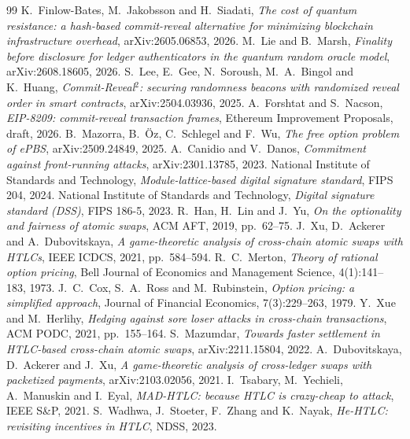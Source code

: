 \documentclass[11pt]{article}
\begin{document}
\begin{thebibliography}{99}
 K.~Finlow-Bates, M.~Jakobsson and H.~Siadati, \emph{The cost of quantum resistance: a hash-based commit-reveal alternative for minimizing blockchain infrastructure overhead}, arXiv:2605.06853, 2026.
 M.~Lie and B.~Marsh, \emph{Finality before disclosure for ledger authenticators in the quantum random oracle model}, arXiv:2608.18605, 2026.
 S.~Lee, E.~Gee, N.~Soroush, M.~A.~Bingol and K.~Huang, \emph{Commit-Reveal$^2$: securing randomness beacons with randomized reveal order in smart contracts}, arXiv:2504.03936, 2025.
 A.~Forshtat and S.~Nacson, \emph{EIP-8209: commit-reveal transaction frames}, Ethereum Improvement Proposals, draft, 2026.
 B.~Mazorra, B.~\"Oz, C.~Schlegel and F.~Wu, \emph{The free option problem of ePBS}, arXiv:2509.24849, 2025.
 A.~Canidio and V.~Danos, \emph{Commitment against front-running attacks}, arXiv:2301.13785, 2023.
 National Institute of Standards and Technology, \emph{Module-lattice-based digital signature standard}, FIPS 204, 2024.
 National Institute of Standards and Technology, \emph{Digital signature standard (DSS)}, FIPS 186-5, 2023.
 R.~Han, H.~Lin and J.~Yu, \emph{On the optionality and fairness of atomic swaps}, ACM AFT, 2019, pp.~62--75.
 J.~Xu, D.~Ackerer and A.~Dubovitskaya, \emph{A game-theoretic analysis of cross-chain atomic swaps with HTLCs}, IEEE ICDCS, 2021, pp.~584--594.
 R.~C.~Merton, \emph{Theory of rational option pricing}, Bell Journal of Economics and Management Science, 4(1):141--183, 1973.
 J.~C.~Cox, S.~A.~Ross and M.~Rubinstein, \emph{Option pricing: a simplified approach}, Journal of Financial Economics, 7(3):229--263, 1979.
 Y.~Xue and M.~Herlihy, \emph{Hedging against sore loser attacks in cross-chain transactions}, ACM PODC, 2021, pp.~155--164.
 S.~Mazumdar, \emph{Towards faster settlement in HTLC-based cross-chain atomic swaps}, arXiv:2211.15804, 2022.
 A.~Dubovitskaya, D.~Ackerer and J.~Xu, \emph{A game-theoretic analysis of cross-ledger swaps with packetized payments}, arXiv:2103.02056, 2021.
 I.~Tsabary, M.~Yechieli, A.~Manuskin and I.~Eyal, \emph{MAD-HTLC: because HTLC is crazy-cheap to attack}, IEEE S\&P, 2021.
 S.~Wadhwa, J.~Stoeter, F.~Zhang and K.~Nayak, \emph{He-HTLC: revisiting incentives in HTLC}, NDSS, 2023.

\end{thebibliography}
\end{document}
